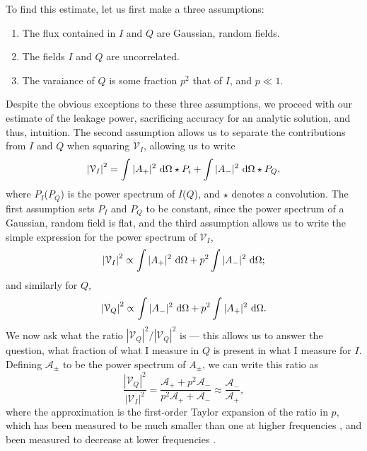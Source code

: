 To find this estimate, let us first make a three assumptions: 
\begin{enumerate}
  \item The flux contained in $I$ and $Q$ are Gaussian, random fields.
  \item The fields $I$ and $Q$ are uncorrelated.
  \item The varaiance of $Q$ is some fraction $p^2$ that of $I$, and $p \ll 1$.
\end{enumerate}
Despite the obvious exceptions to these three assumptions, we proceed with our estimate of the
leakage power, sacrificing accuracy for an analytic solution, and thus, intuition. The second
assumption allows us to separate the contributions from $I$ and $Q$ when squaring $\mathcal{V}_I$,
allowing us to write 
\begin{equation}
  \left|\mathcal{V}_I\right|^2 = \int |A_+|^2\ \mathrm{d}\Omega \star P_i + \int|A_-|^2\ \mathrm{d}\Omega\star P_Q, 
\end{equation}
where $P_I$($P_Q$) is the power spectrum of $I$($Q$), and $\star$ denotes a convolution. The first
assumption sets $P_I$ and $P_Q$ to be constant, since the power spectrum of a Gaussian, random field is
flat, and the third assumption allows us to write the simple expression for the power spectrum of
$\mathcal{V}_I$,
\begin{equation}
  \left|\mathcal{V}_I\right|^2 \propto \int |A_+|^2\ \mathrm{d}\Omega + p^2\int|A_-|^2\ \mathrm{d}\Omega;
\end{equation}
and similarly for $Q$, 
\begin{equation}
  \left|\mathcal{V}_Q\right|^2 \propto \int |A_-|^2 \ \mathrm{d}\Omega + p^2\int |A_+|^2\ \mathrm{d}\Omega.
\end{equation}
We now ask what the ratio $|\mathcal{V}_Q|^2/|\mathcal{V}_Q|^2$ is --- this allows us to answer the
question, what fraction of what I measure in $Q$ is present in what I measure for $I$. Defining $\mathcal{A}_\pm$ to be the power spectrum of $A_\pm$, we can write this ratio as 
\begin{equation}
  \frac{\left|\mathcal{V}_Q\right|^2}{\left|\mathcal{V}_I\right|^2}
    = \frac{\mathcal{A}_+ + p^2\mathcal{A}_-}{p^2\mathcal{A}_+ + \mathcal{A}_-}
    \approx \frac{\mathcal{A}_-}{\mathcal{A}_+},
    \label{eq:beam_metric}
\end{equation}
where the approximation is the first-order Taylor expansion of the ratio in $p$, which has been
measured to be much smaller than one at higher frequencies \cite{Tucci2012}, and been
measured to decrease at lower frequencies \cite[][e.g.]{Bernardi2009}.

